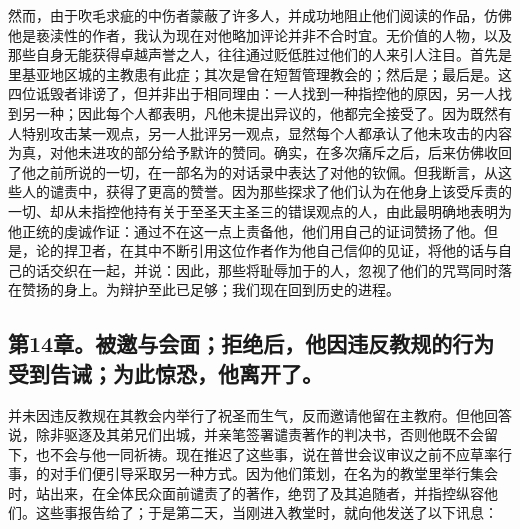 然而，由于吹毛求疵的中伤者蒙蔽了许多人，并成功地阻止他们阅读的作品，仿佛他是亵渎性的作者，我认为现在对他略加评论并非不合时宜。无价值的人物，以及那些自身无能获得卓越声誉之人，往往通过贬低胜过他们的人来引人注目。首先是里基亚地区城的主教患有此症；其次是曾在短暂管理教会的；然后是；最后是。这四位诋毁者诽谤了，但并非出于相同理由：一人找到一种指控他的原因，另一人找到另一种；因此每个人都表明，凡他未提出异议的，他都完全接受了。因为既然有人特别攻击某一观点，另一人批评另一观点，显然每个人都承认了他未攻击的内容为真，对他未进攻的部分给予默许的赞同。确实，在多次痛斥之后，后来仿佛收回了他之前所说的一切，在一部名为的对话录中表达了对他的钦佩。但我断言，从这些人的谴责中，获得了更高的赞誉。因为那些探求了他们认为在他身上该受斥责的一切、却从未指控他持有关于至圣天主圣三的错误观点的人，由此最明确地表明为他正统的虔诚作证：通过不在这一点上责备他，他们用自己的证词赞扬了他。但是，论的捍卫者，在其中不断引用这位作者作为他自己信仰的见证，将他的话与自己的话交织在一起，并说：因此，那些将耻辱加于的人，忽视了他们的咒骂同时落在赞扬的身上。为辩护至此已足够；我们现在回到历史的进程。\par


\subsection{第14章。被邀与会面；拒绝后，他因违反教规的行为受到告诫；为此惊恐，他离开了。}

并未因违反教规在其教会内举行了祝圣而生气，反而邀请他留在主教府。但他回答说，除非驱逐及其弟兄们出城，并亲笔签署谴责著作的判决书，否则他既不会留下，也不会与他一同祈祷。现在推迟了这些事，说在普世会议审议之前不应草率行事，的对手们便引导采取另一种方式。因为他们策划，在名为的教堂里举行集会时，站出来，在全体民众面前谴责了的著作，绝罚了及其追随者，并指控纵容他们。这些事报告给了；于是第二天，当刚进入教堂时，就向他发送了以下讯息：\par

